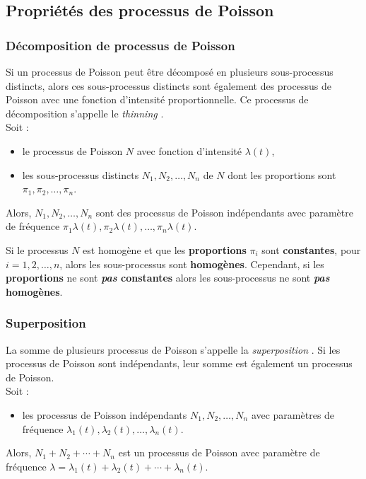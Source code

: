 \documentclass[10pt, french]{article}
\begin{document}
\begin{multicols*}{2}
\subsection{Propriétés des processus de Poisson}
\subsubsection{Décomposition de processus de Poisson}
\begin{definitionNOHFILL}
Si un processus de Poisson peut être décomposé en plusieurs sous-processus distincts, alors ces sous-processus distincts sont également des processus de Poisson avec une fonction d'intensité proportionnelle. Ce processus de décomposition s'appelle le \og \textit{thinning} \fg{}.	\\

Soit :
\begin{itemize}
	\item	le processus de Poisson $N$ avec fonction d'intensité $\lambda(t)$,
	\item	les sous-processus distincts $N_{1}, N_{2}, \dots, N_{n}$ de $N$ dont les proportions sont $\pi_{1}, \pi_{2}, \dots, \pi_{n}$.
\end{itemize}
Alors, $N_{1}, N_{2}, \dots, N_{n}$ sont des processus de Poisson indépendants avec paramètre de fréquence $\pi_{1}\lambda(t), \pi_{2}\lambda(t), \dots, \pi_{n}\lambda(t)$.
\end{definitionNOHFILL}

Si le processus $N$ est homogène et que les \textbf{proportions} $\pi_{i}$ sont \textbf{constantes}, pour $i = 1, 2, \dots, n$, alors les sous-processus sont \textbf{homogènes}. Cependant, si les \textbf{proportions} ne sont \textbf{\textit{pas} constantes} alors les sous-processus ne sont \textbf{\textit{pas} homogènes}.


\subsubsection{Superposition}
\begin{definitionNOHFILL}
La somme de plusieurs processus de Poisson s'appelle la \og \textit{superposition} \fg{}.	 Si les processus de Poisson sont indépendants, leur somme est également un processus de Poisson.	\\

Soit :
\begin{itemize}
	\item	les processus de Poisson indépendants $N_{1}, N_{2}, \dots, N_{n}$ avec paramètres de fréquence $\lambda_{1}(t), \lambda_{2}(t), \dots, \lambda_{n}(t)$.
\end{itemize}
Alors, $N_{1} + N_{2} + \cdots + N_{n}$ est un processus de Poisson avec paramètre de fréquence $\lambda	=	\lambda_{1}(t) + \lambda_{2}(t) + \cdots + \lambda_{n}(t)$.
\end{definitionNOHFILL}



\end{multicols*}
\end{document}
